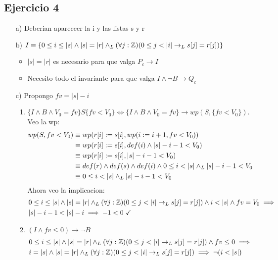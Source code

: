 \documentclass{article}
\begin{document}
\subsection*{Ejercicio 4}
\begin{itemize}
    \item [a) ] Deberian apareceer la i y las listas s y r
    \item [b) ] $I\equiv\{\enRangoInc{i}{s} \land |s|=|r| \land_L (\forall j:\entero)(\enRango{j}{i}\to_L s[j]=r[j])\}$

    \begin{itemize}
        \item $|s|=|r|$ es necesario para que valga $P_c\to I$
        \item Necesito todo el invariante para que valga $I\land \neg B \to Q_c$
    \end{itemize}
    \item [c) ]Propongo $fv=|s|-i$\\
    \begin{enumerate}
        \item $\{I\land B\land V_0=fv\}S\{fv<V_0\}\Longleftrightarrow \{I\land B\land V_0=fv\}\to wp(S,\{fv<V_0\})$. Veo la wp:\\
        \cont\begin{align}
            wp(S,fv<V_0)&\equiv wp(r[i]:=s[i],wp(i:=i+1,fv<V_0))\\
            &\equiv wp(r[i]:=s[i],def(i)\land |s|-i-1<V_0)\\
            &\equiv wp(r[i]:=s[i],|s|-i-1<V_0)\\
            &\equiv def(r)\land def(s)\land def(i)\land \enRango{i}{s}\land_L |s|-i-1<V_0\\
            &\equiv \enRango{i}{s}\land_L |s|-i-1<V_0
        \end{align}
        Ahora veo la implicacion:
        \cont\begin{align}
            &\enRangoInc{i}{s} \land |s|=|r| \land_L (\forall j:\entero)(\enRango{j}{i}\to_L s[j]=r[j]) \land i<|s| \land fv=V_0 \implies\\
            &|s|-i-1<|s|-i \implies -1<0 \ \checkmark
        \end{align}
        \newpage
        \item $(I\land fv\leq0)\to \neg B$\\
        \cont\begin{align}
            &\enRangoInc{i}{s} \land |s|=|r| \land_L (\forall j:\entero)(\enRango{j}{i}\to_L s[j]=r[j])\land fv\leq 0 \implies\\
            &i=|s| \land |s|=|r|\land_L (\forall j:\entero)(\enRango{j}{i}\to_L s[j]=r[j])\implies \neg (i<|s|)
        \end{align}
    \end{enumerate}
\end{itemize}
\end{document}
